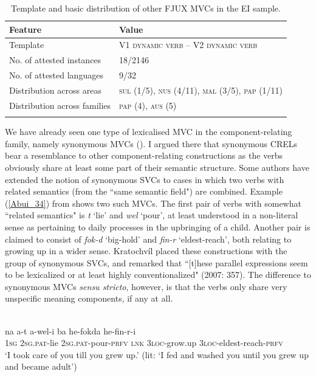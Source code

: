 \begin{table}
\begin{tabular}{ll}
\lsptoprule
Feature&Value\tabularnewline
\midrule
Template& V1 \textsc{dynamic verb} -- V2 \textsc{dynamic verb}\tabularnewline
No. of attested instances& 18/2146 \tabularnewline
No. of attested languages& 9/32 \tabularnewline
Distribution across areas& \textsc{sul} (1/5), \textsc{nus} (4/11), \textsc{mal} (3/5), \textsc{pap} (1/11) \tabularnewline
Distribution across families& \textsc{pap} (4), \textsc{aus} (5) \tabularnewline
\lspbottomrule
\end{tabular}
\caption[Template and basic distribution of other FJUX MVCs]{Template and basic distribution of other FJUX MVCs in the EI sample.}
\label{table:other_fjux}
\end{table}

We have already seen one type of lexicalised MVC in the component-relating family, namely synonymous MVCs (). I argued there that synonymous CRELs bear a resemblance to other component-relating constructions as the verbs obviously share at least some part of their semantic structure. Some authors have extended the notion of synonymous SVCs to cases in which two verbs with related semantics (from the ``same semantic field") are combined. Example (\ref{Abui_34}) from  shows two such MVCs. The first pair of verbs with somewhat ``related semantics" is \textit{t} `lie' and \textit{wel} `pour', at least understood in a non-literal sense as pertaining to daily processes in the upbringing of a child. Another pair is claimed to consist of \textit{fok-d} `big-hold' and \textit{fin-r} `eldest-reach', both relating to growing up in a wider sense. Kratochvíl placed these constructions with the group of synonymous SVCs, and remarked that ``[t]hese parallel expressions seem to be lexicalized or at least highly conventionalized" (2007: 357). The difference to synonymous MVCs \textit{sensu stricto}, however, is that the verbs only share very unspecific meaning components, if any at all.

\ea \label{Abui_34}
\\
\gll na a-t a-wel-i ba he-fokda he-fin-r-i \\
1\textsc{sg} 2\textsc{sg}.\textsc{pat}-lie 2\textsc{sg}.\textsc{pat}-pour-\textsc{prfv} \textsc{lnk} 3\textsc{loc}-grow.up 3\textsc{loc}-eldest-reach-\textsc{prfv} \\
\glft ‘I took care of you till you grew up.’ (lit: ‘I fed and washed you until you grew up and
became adult’)\\
\z

